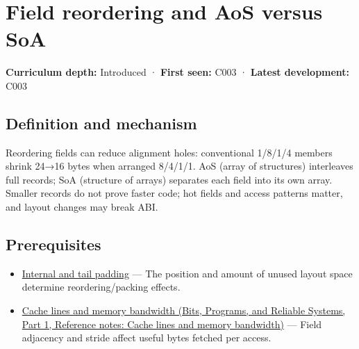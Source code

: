 \hypertarget{appendix-5522ad176ca0}{}\label{referencestart:appendix-5522ad176ca0}
\section{Field reordering and AoS versus SoA}\label{appendix-5522ad176ca0-field-reordering-and-aos-versus-soa}

\hypertarget{appendix-5522ad176ca0-field-reordering-and-aos-versus-soa}{}

\textbf{Curriculum depth:} Introduced · \textbf{First seen:} C003 · \textbf{Latest development:} C003

\begin{allmightroledefinition}

\subsection{Definition and mechanism}\label{appendix-5522ad176ca0-definition-and-mechanism}

\hypertarget{appendix-5522ad176ca0-definition-and-mechanism}{}

Reordering fields can reduce alignment holes: conventional 1/8/1/4 members shrink 24→16 bytes when arranged 8/4/1/1. AoS (array of structures) interleaves full records; SoA (structure of arrays) separates each field into its own array. Smaller records do not prove faster code; hot fields and access patterns matter, and layout changes may break ABI.

\end{allmightroledefinition}

\subsection{Prerequisites}\label{appendix-5522ad176ca0-prerequisites}

\hypertarget{appendix-5522ad176ca0-prerequisites}{}

\begin{itemize}
\tightlist
\item
  \hyperref[appendix-f52f8c5a3afd]{Internal and tail padding} --- The position and amount of unused layout space determine reordering/packing effects.
\item
  \href{../01-Bits-Programs-and-Reliable-Systems-P01/main.pdf\#appendix-e4ccdbab8320}{Cache lines and memory bandwidth (Bits, Programs, and Reliable Systems, Part 1, Reference notes: Cache lines and memory bandwidth)} --- Field adjacency and stride affect useful bytes fetched per access.
\end{itemize}

